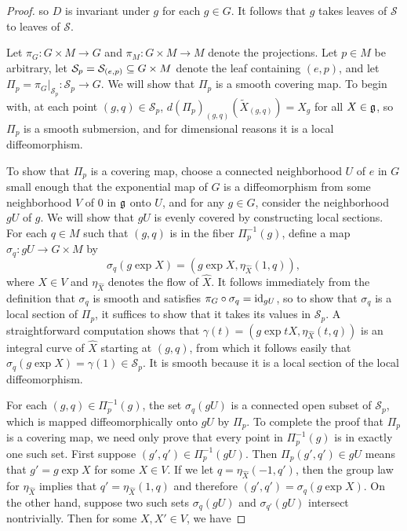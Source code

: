 \begin{proof}
so $D$ is invariant under $g$ for each $g\in G$. It follows that $g$ takes leaves of $\mathcal{S}$ to leaves of $\mathcal{S}$.\par
Let $\pi_G:G\times M\to G$ and $\pi_M:G\times M\to M$ denote the projections. Let $p\in M$ be arbitrary, let $\mathcal{S}_p=\mathcal{S}_{(e,p)}\subseteq G\times M$ denote the leaf containing $(e,p)$, and let $\Pi_p=\pi_G|_{\mathcal{S}_p}:\mathcal{S}_p\to G$. We will show that $\Pi_p$ is a smooth covering map. To begin with, at each point $(g,q)\in\mathcal{S}_p$, $d(\Pi_p)_{(g,q)}(\widetilde{X}_{(g,q)})=X_g$ for all $X\in\mathfrak{g}$, so $\Pi_p$ is a smooth submersion, and for dimensional reasons it is a local diffeomorphism.\par
To show that $\Pi_p$ is a covering map, choose a connected neighborhood $U$ of $e$ in $G$ small enough that the exponential map of $G$ is a diffeomorphism from some neighborhood $V$ of $0$ in $\mathfrak{g}$ onto $U$, and for any $g\in G$, consider the neighborhood $gU$ of $g$. We will show that $gU$ is evenly covered by constructing local sections. For each $q\in M$ such that $(g,q)$ is in the fiber $\Pi_p^{-1}(g)$, define a map $\sigma_q:gU\to G\times M$ by
\[\sigma_q(g\exp X)=(g\exp X,\eta_{\widehat{X}}(1,q)),\]
where $X\in V$ and $\eta_{\widehat{X}}$ denotes the flow of $\widehat{X}$. It follows immediately from the definition that $\sigma_q$ is smooth and satisfies $\pi_G\circ\sigma_q=\mathrm{id}_{gU}$, so to show that $\sigma_q$ is a local section of $\Pi_p$, it suffices to show that it takes its values in $\mathcal{S}_p$. A straightforward computation shows that $\gamma(t)=(g\exp tX,\eta_{\widehat{X}}(t,q))$ is an integral curve of $\widehat{X}$ starting at $(g,q)$, from which it follows easily that $\sigma_q(g\exp X)=\gamma(1)\in\mathcal{S}_p$. It is smooth because it is a local section of the local diffeomorphism.\par
For each $(g,q)\in\Pi_p^{-1}(g)$, the set $\sigma_q(gU)$ is a connected open subset of $\mathcal{S}_p$, which is mapped diffeomorphically onto $gU$ by $\Pi_p$. To complete the proof that $\Pi_p$ is a covering map, we need only prove that every point in $\Pi_p^{-1}(g)$ is in exactly one such set. First suppose $(g',q')\in\Pi_p^{-1}(gU)$. Then $\Pi_p(g',q')\in gU$ means that $g'=g\exp X$ for some $X\in V$. If we let $q=\eta_{\widehat{X}}(-1,q')$, then the group law for $\eta_{\widehat{X}}$ implies that $q'=\eta_{\widehat{X}}(1,q)$ and therefore $(g',q')=\sigma_q(g\exp X)$. On the other hand, suppose two such sets $\sigma_q(gU)$ and $\sigma_{q'}(gU)$ intersect nontrivially. Then for some $X,X'\in V$, we have

\end{proof}
